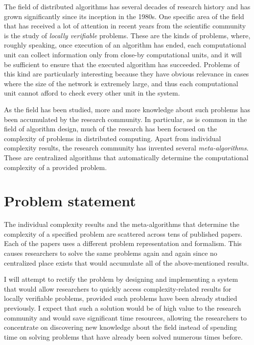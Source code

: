 The field of distributed algorithms has several
decades of research history and has grown
significantly since its inception in the 1980s.
One specific
area of the field that has received a lot of
attention in recent years from the scientific
community is the study of \emph{locally verifiable}
problems.
These are the kinds of problems, where, roughly speaking,
once execution of an algorithm has ended, each
computational unit can
collect information only from close-by computational units,
and it will be sufficient to ensure that the executed algorithm has succeeded. Problems of this kind are particularly
interesting because they have obvious relevance
in cases where the size of the network is extremely
large, and thus each computational unit
cannot afford to check every other unit in the system.

As the field has been studied, more and more knowledge
about such problems has been accumulated by the
research community. In particular, as is common
in the field of algorithm design, much of the
research has been focused on the complexity of
problems in distributed computing. Apart from
individual complexity results, the research
community has invented several \emph{meta-algorithms}.
These are centralized algorithms that
automatically determine the
computational complexity of a provided
problem.

\section{Problem statement}

The individual complexity results and the meta-algorithms
that determine the complexity of a specified problem are
scattered across tens of published papers. Each of the
papers uses a different problem representation and
formalism. This causes researchers to solve
the same problems again and again since no
centralized place exists that would accumulate all of the
above-mentioned results.

I will attempt to rectify the
problem by designing and implementing a system
that would allow researchers to quickly
access complexity-related results for locally
verifiable problems, provided such problems have been
already studied
previously. I expect that such a solution
would be of high value to the research community and
would save significant time resources, allowing the researchers
to concentrate on discovering new knowledge about the
field instead of spending time on solving problems that
have already been solved numerous times before.

